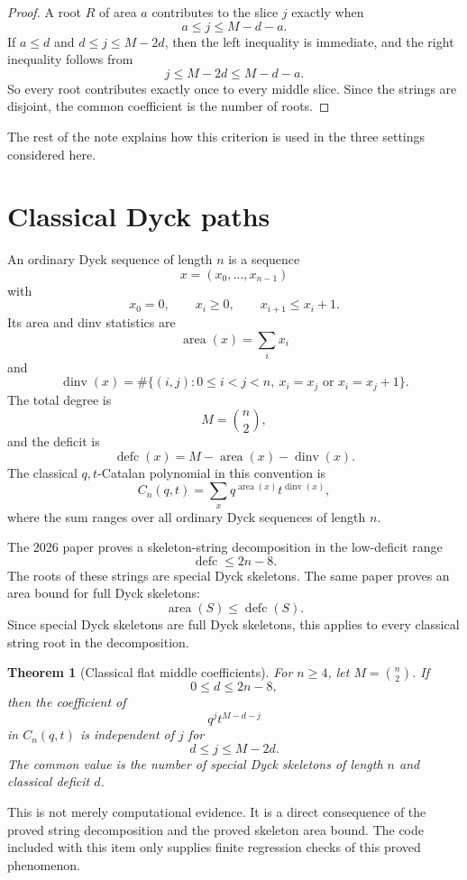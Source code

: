 \documentclass{article}
\DeclareMathOperator{\area}{area}
\DeclareMathOperator{\dinv}{dinv}
\DeclareMathOperator{\defc}{defc}
\newtheorem{theorem}{Theorem}
\begin{document}
\begin{proof}
A root \(R\) of area \(a\) contributes to the slice \(j\) exactly when
\[
  a\le j\le M-d-a.
\]
If \(a\le d\) and \(d\le j\le M-2d\), then the left inequality is immediate,
and the right inequality follows from
\[
  j\le M-2d\le M-d-a.
\]
So every root contributes exactly once to every middle slice.  Since the
strings are disjoint, the common coefficient is the number of roots.
\end{proof}

The rest of the note explains how this criterion is used in the three settings
considered here.

\section{Classical Dyck paths}

An ordinary Dyck sequence of length \(n\) is a sequence
\[
  x=(x_0,\ldots,x_{n-1})
\]
with
\[
  x_0=0,\qquad x_i\ge0,\qquad x_{i+1}\le x_i+1.
\]
Its area and dinv statistics are
\[
  \area(x)=\sum_i x_i
\]
and
\[
  \dinv(x)=
  \#\{(i,j):0\le i<j<n,
      \ x_i=x_j\text{ or }x_i=x_j+1\}.
\]
The total degree is
\[
  M=\binom n2,
\]
and the deficit is
\[
  \defc(x)=M-\area(x)-\dinv(x).
\]
The classical \(q,t\)-Catalan polynomial in this convention is
\[
  C_n(q,t)=\sum_x q^{\area(x)}t^{\dinv(x)},
\]
where the sum ranges over all ordinary Dyck sequences of length \(n\).

The 2026 paper proves a skeleton-string decomposition in the low-deficit range
\[
  \defc\le 2n-8.
\]
The roots of these strings are special Dyck skeletons.  The same paper proves
an area bound for full Dyck skeletons:
\[
  \area(S)\le \defc(S).
\]
Since special Dyck skeletons are full Dyck skeletons, this applies to every
classical string root in the decomposition.

\begin{theorem}[Classical flat middle coefficients]
For \(n\ge4\), let \(M=\binom n2\).  If
\[
  0\le d\le 2n-8,
\]
then the coefficient of
\[
  q^j t^{M-d-j}
\]
in \(C_n(q,t)\) is independent of \(j\) for
\[
  d\le j\le M-2d.
\]
The common value is the number of special Dyck skeletons of length \(n\) and
classical deficit \(d\).
\end{theorem}

This is not merely computational evidence.  It is a direct consequence of the
proved string decomposition and the proved skeleton area bound.  The code
included with this item only supplies finite regression checks of this proved
phenomenon.
\end{document}
